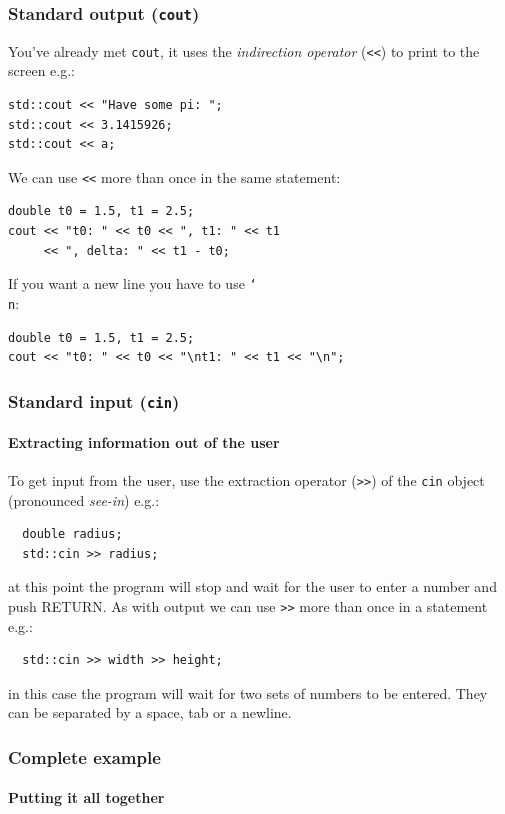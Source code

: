 \documentclass{beamer}
\begin{document}
\begin{frame}[fragile]
  \frametitle{Standard output (\texttt{cout})}
  
  You've already met \texttt{cout}, it uses the \textit{indirection operator} (\texttt{<<}) to print to the screen e.g.:
  \begin{lstlisting}
std::cout << "Have some pi: ";
std::cout << 3.1415926;
std::cout << a;
  \end{lstlisting}
  \pause
  We can use \texttt{<<} more than once in the same statement:
  \begin{lstlisting}
double t0 = 1.5, t1 = 2.5;
cout << "t0: " << t0 << ", t1: " << t1
     << ", delta: " << t1 - t0;
  \end{lstlisting}
	\newline\pause
  If you want a new line you have to use \texttt{\char`\\ n}:
  \begin{lstlisting}
double t0 = 1.5, t1 = 2.5;
cout << "t0: " << t0 << "\nt1: " << t1 << "\n";
  \end{lstlisting}
\end{frame}

\begin{frame}[fragile]
  \frametitle{Standard input (\texttt{cin})}
  \framesubtitle{Extracting information out of the user}
  To get input from the user, use the extraction operator (\texttt{>>}) of the \texttt{cin} object (pronounced \textit{see-in}) e.g.:
  \begin{lstlisting}
  double radius;
  std::cin >> radius;
  \end{lstlisting}
  at this point the program will stop and wait for the user to enter a number and push RETURN.
  \pause
  As with output we can use \texttt{>>} more than once in a statement e.g.:
  \begin{lstlisting}
  std::cin >> width >> height;
  \end{lstlisting}
  in this case the program will wait for two sets of numbers to be entered.  They can be separated by a space, tab or a newline.
\end{frame}

\begin{frame}[fragile]
  \frametitle{Complete example}
  \framesubtitle{Putting it all together}
  
\end{frame}
\end{document}
